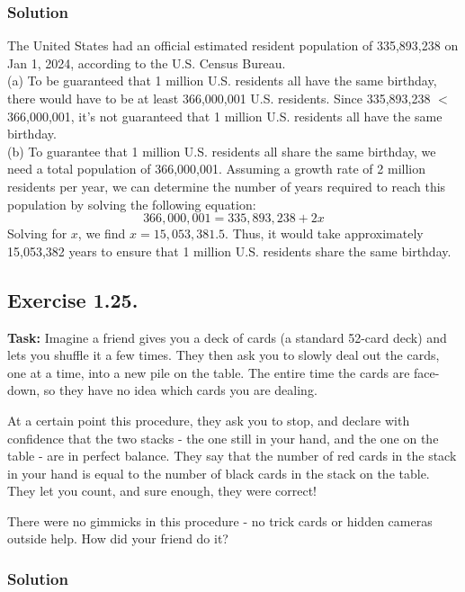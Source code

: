 \documentclass{article}
\begin{document}
\subsubsection*{Solution}

The United States had an official estimated resident population of 335,893,238 on Jan 1, 2024, according to the U.S. Census Bureau. \\

\noindent (a) To be guaranteed that 1 million U.S. residents all have the same birthday, there would have to be at least 366,000,001 U.S. residents. Since 335,893,238 $<$ 366,000,001, it's not guaranteed that 1 million U.S. residents all have the same birthday.\\

\noindent (b) To guarantee that 1 million U.S. residents all share the same birthday, we need a total population of 366,000,001. Assuming a growth rate of 2 million residents per year, we can determine the number of years required to reach this population by solving the following equation: 
\[
366,000,001 = 335,893,238 + 2x
\]
Solving for \(x\), we find \(x = 15,053,381.5\). Thus, it would take approximately 15,053,382 years to ensure that 1 million U.S. residents share the same birthday.

\newpage

\subsection{Exercise 1.25.} 
\textbf{Task:} Imagine a friend gives you a deck of cards (a standard 52-card deck) and lets you shuffle it a few times. They then ask you to slowly deal out the cards, one at a time, into a new pile on the table. The entire time the cards are face-down, so they have no idea which cards you are dealing.

At a certain point this procedure, they ask you to stop, and declare with confidence that the two stacks - the one still in your hand, and the one on the table - are in perfect balance. They say that the number of red cards in the stack in your hand is equal to the number of black cards in the stack on the table. They let you count, and sure enough, they were correct!

There were no gimmicks in this procedure - no trick cards or hidden cameras outside help. How did your friend do it?

\subsubsection*{Solution}
\end{document}
